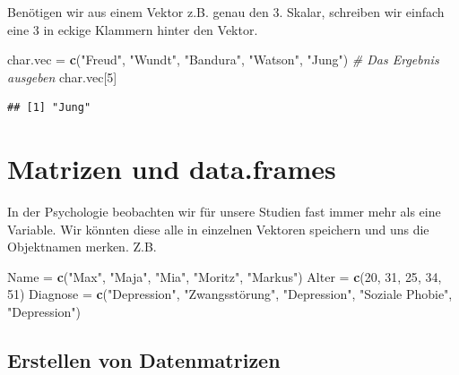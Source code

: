 \documentclass[
]{book}
\newenvironment{Shaded}{\begin{snugshade}}{\end{snugshade}}
\newcommand{\CommentTok}[1]{\textcolor[rgb]{0.56,0.35,0.01}{\textit{#1}}}
\newcommand{\DecValTok}[1]{\textcolor[rgb]{0.00,0.00,0.81}{#1}}
\newcommand{\FunctionTok}[1]{\textcolor[rgb]{0.13,0.29,0.53}{\textbf{#1}}}
\newcommand{\NormalTok}[1]{#1}
\newcommand{\OtherTok}[1]{\textcolor[rgb]{0.56,0.35,0.01}{#1}}
\newcommand{\StringTok}[1]{\textcolor[rgb]{0.31,0.60,0.02}{#1}}
\begin{document}
Benötigen wir aus einem Vektor z.B. genau den 3. Skalar, schreiben wir einfach eine 3 in eckige Klammern hinter den Vektor.

\begin{Shaded}
\begin{Highlighting}[]
\NormalTok{char.vec }\OtherTok{=} \FunctionTok{c}\NormalTok{(}\StringTok{"Freud"}\NormalTok{, }\StringTok{"Wundt"}\NormalTok{, }\StringTok{"Bandura"}\NormalTok{, }\StringTok{"Watson"}\NormalTok{, }\StringTok{"Jung"}\NormalTok{)}
\CommentTok{\# Das Ergebnis ausgeben}
\NormalTok{char.vec[}\DecValTok{5}\NormalTok{]}
\end{Highlighting}
\end{Shaded}

\begin{verbatim}
## [1] "Jung"
\end{verbatim}

\section{Matrizen und data.frames}\label{matrizen-und-data.frames}

In der Psychologie beobachten wir für unsere Studien fast immer mehr als eine Variable. Wir könnten diese alle in einzelnen Vektoren speichern und uns die Objektnamen merken. Z.B.

\begin{Shaded}
\begin{Highlighting}[]
\NormalTok{Name }\OtherTok{=} \FunctionTok{c}\NormalTok{(}\StringTok{"Max"}\NormalTok{, }\StringTok{"Maja"}\NormalTok{, }\StringTok{"Mia"}\NormalTok{, }\StringTok{"Moritz"}\NormalTok{, }\StringTok{"Markus"}\NormalTok{)}
\NormalTok{Alter }\OtherTok{=} \FunctionTok{c}\NormalTok{(}\DecValTok{20}\NormalTok{, }\DecValTok{31}\NormalTok{, }\DecValTok{25}\NormalTok{, }\DecValTok{34}\NormalTok{, }\DecValTok{51}\NormalTok{)}
\NormalTok{Diagnose }\OtherTok{=} \FunctionTok{c}\NormalTok{(}\StringTok{"Depression"}\NormalTok{, }\StringTok{"Zwangsstörung"}\NormalTok{, }\StringTok{"Depression"}\NormalTok{, }\StringTok{"Soziale Phobie"}\NormalTok{, }\StringTok{"Depression"}\NormalTok{)}
\end{Highlighting}
\end{Shaded}

\subsection{Erstellen von Datenmatrizen}\label{erstellen-von-datenmatrizen}
\end{document}
